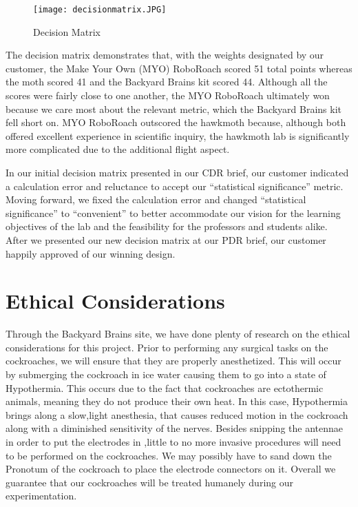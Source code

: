 \documentclass{article}
\begin{document}
\begin{figure}[ht!]
\centering
\texttt{[image: decisionmatrix.JPG]}
\caption{Decision Matrix}
\label{fig:DecisionMatrix}
\end{figure}

 The decision matrix demonstrates that, with the weights designated by our customer, the Make Your Own (MYO) RoboRoach scored 51 total points whereas the moth scored 41 and the Backyard Brains kit scored 44. Although all the scores were fairly close to one another, the MYO RoboRoach ultimately won because we care most about the relevant metric, which the Backyard Brains kit fell short on. MYO RoboRoach outscored the hawkmoth because, although both offered excellent experience in scientific inquiry, the hawkmoth lab is significantly more complicated due to the additional flight aspect.



 In our initial decision matrix presented in our CDR brief, our customer indicated a calculation error and reluctance to accept our ``statistical significance'' metric. Moving forward, we fixed the calculation error and changed ``statistical significance'' to ``convenient'' to better accommodate our vision for the learning objectives of the lab and the feasibility for the professors and students alike. After we presented our new decision matrix at our PDR brief, our customer happily approved of our winning design.

\section{Ethical Considerations}
 Through the Backyard Brains site, we have done plenty of research on the ethical considerations for this project. Prior to performing any surgical tasks on the cockroaches, we will ensure that they are properly anesthetized. This will occur by submerging the cockroach in ice water causing them to go into a state of Hypothermia. This occurs due to the fact that cockroaches are ectothermic animals, meaning they do not produce their own heat. In this case, Hypothermia brings along a slow,light anesthesia, that causes reduced motion in the cockroach along with a diminished sensitivity of the nerves. Besides snipping the antennae in order to put the electrodes in ,little to no more invasive procedures will need to be performed on the cockroaches. We may possibly have to sand down the Pronotum of the cockroach to place the electrode connectors on it. Overall we guarantee that our cockroaches will be treated humanely during our experimentation.
\end{document}
